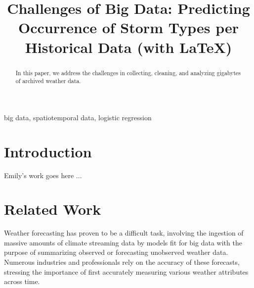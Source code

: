 \documentclass[conference]{IEEEtran}
\begin{document}
\title{Challenges of Big Data: Predicting Occurrence of Storm Types per Historical Data (with \LaTeX)}
\author{
\and
{}
\and
{}
}

\maketitle

\begin{abstract}
In this paper, we address the challenges in collecting, cleaning, and analyzing gigabytes of archived weather data.
\end{abstract}

\begin{IEEEkeywords}
big data, spatiotemporal data, logistic regression
\end{IEEEkeywords}

\section{Introduction}

Emily's work goes here ...

\section{Related Work}

Weather forecasting has proven to be a difficult task, involving the ingestion of massive amounts of climate streaming data by models fit for big data with the purpose of summarizing observed or forecasting unobserved weather data. Numerous industries and professionals rely on the accuracy of these forecasts, stressing the importance of first accurately measuring various weather attributes across time.
\end{document}
